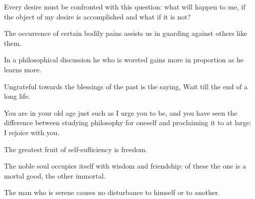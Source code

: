 \documentclass{stex}
\begin{document}
\vspace{0.5em}
\begin{sparagraph}[title=71]
  Every desire must be confronted with this question: what will happen to me, if the object of my desire is accomplished and what if it is not?
\end{sparagraph}

\vspace{0.5em}
\begin{sparagraph}[title=73]
  The occurrence of certain bodily pains assists us in guarding against others like them.
\end{sparagraph}

\vspace{0.5em}
\begin{sparagraph}[title=74]
  In a philosophical discussion he who is worsted gains more in proportion as he learns more.
\end{sparagraph}

\vspace{0.5em}
\begin{sparagraph}[title=75]
  Ungrateful towards the blessings of the past is the saying, Wait till the end of a long life.
\end{sparagraph}

\vspace{0.5em}
\begin{sparagraph}[title=76]
  You are in your old age just such as I urge you to be, and you have seen the difference between studying philosophy for oneself and proclaiming it to  at large: I rejoice with you.
\end{sparagraph}

\vspace{0.5em}
\begin{sparagraph}[title=77]
  The greatest fruit of self-sufliciency is freedom.
\end{sparagraph}

\vspace{0.5em}
\begin{sparagraph}[title=78]
  The noble soul occupies itself with wisdom and friendship: of these the one is a mortal good, the other immortal.
\end{sparagraph}

\vspace{0.5em}
\begin{sparagraph}[title=79]
  The man who is serene causes no disturbance to himself or to another.
\end{sparagraph}
\end{document}
